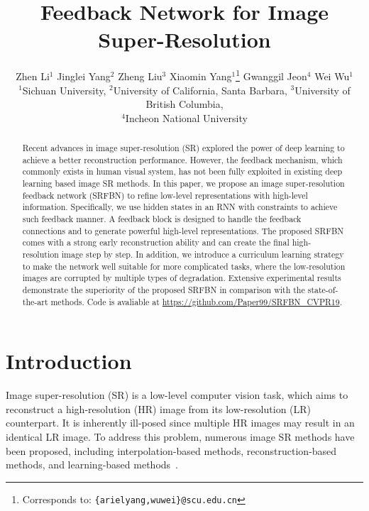 \documentclass[10pt,twocolumn,letterpaper]{article}
\newcommand*\samethanks[1][\value{footnote}]{\footnotemark[#1]}
\begin{document}
	
\title{Feedback Network for Image Super-Resolution}

\author{Zhen Li$^{1}$ \quad Jinglei Yang$^{2}$ \quad Zheng Liu$^{3}$ \quad Xiaomin Yang$^{1}$\thanks{Corresponds to: {\tt\footnotesize \{arielyang,wuwei\}@scu.edu.cn}} \quad Gwanggil Jeon$^{4}$ \quad Wei Wu$^{1}$\samethanks\\
	$^1$Sichuan University, $^2$University of California, Santa Barbara, $^3$University of British Columbia,\\ $^4$Incheon National University	
}	

	\maketitle


\begin{abstract}		
	Recent advances in image super-resolution (SR) explored the power of deep learning to achieve a better reconstruction performance. However, the feedback mechanism, which commonly exists in human visual system, has not been fully exploited in existing deep learning based image SR methods. In this paper, we propose an image super-resolution feedback network (SRFBN) to refine low-level representations with high-level information. Specifically, we use hidden states in an RNN with constraints to achieve such feedback manner. A feedback block is designed to handle the feedback connections and to generate powerful high-level representations. The proposed SRFBN comes with a strong early reconstruction ability and can create the final high-resolution image step by step. In addition, we introduce a curriculum learning strategy to make the network well suitable for more complicated tasks, where the low-resolution images are corrupted by multiple types of degradation. Extensive experimental results demonstrate the superiority of the proposed SRFBN in comparison with the state-of-the-art methods. Code is avaliable at \url{https://github.com/Paper99/SRFBN_CVPR19}.
\end{abstract}
	
\section{Introduction}
	Image super-resolution (SR) is a low-level computer vision task, which aims to reconstruct a high-resolution (HR) image from its low-resolution (LR) counterpart. It is inherently ill-posed since multiple HR images may result in an identical LR image. To address this problem, numerous image SR methods have been proposed, including interpolation-based methods\cite{zhang2006edge}, reconstruction-based methods\cite{zhang2012single}, and learning-based methods~\cite{Timofte13, DBLP:journals/tip/PelegE14, Timofte15, DBLP:conf/cvpr/HuangSA15, DBLP:conf/cvpr/SchulterLB15, dong2014learning, Kim_2016_CVPR}.
	
\end{document}
